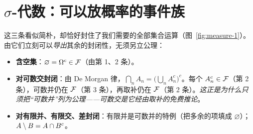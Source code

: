 \section{$\sigma$-代数：可以放概率的事件族}
\label{sec:measure-sigma}


这三条看似简朴，却恰好封住了我们需要的全部集合运算（图~\ref{fig:measure-1}）。由它们立刻可以\emph{导出}其余的封闭性，无须另立公理：

\begin{itemize}
    \item \textbf{含空集}：$\varnothing=\Omega^c\in\mathcal{F}$（由第 1、2 条）。
    \item \textbf{对可数交封闭}：由 De Morgan 律，$\bigcap_n A_n=\bigl(\bigcup_n A_n^c\bigr)^c$。每个 $A_n^c\in\mathcal{F}$（第 2 条），可数并仍在 $\mathcal{F}$（第 3 条），再取补仍在 $\mathcal{F}$（第 2 条）。\emph{这正是为什么只须把``可数并''列为公理——可数交是它经由取补的免费推论}。
    \item \textbf{对有限并、有限交、差封闭}：有限并是可数并的特例（把多余的项填成 $\varnothing$）；$A\setminus B=A\cap B^c$。
\end{itemize}

